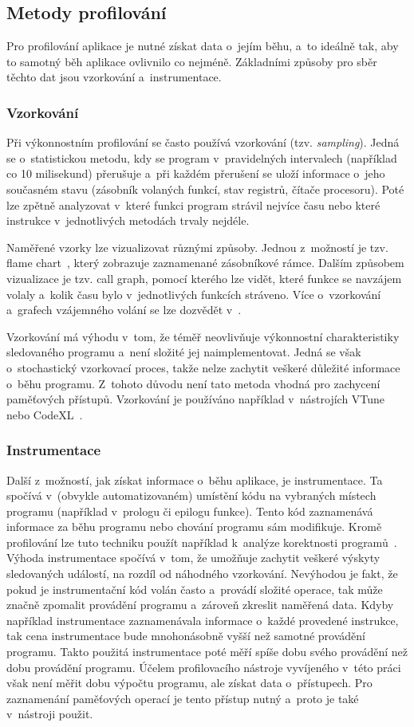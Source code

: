 \subsection{Metody profilování}
Pro profilování aplikace je nutné získat data o~jejím běhu, a~to ideálně tak, aby to samotný běh aplikace ovlivnilo co nejméně. Základními způsoby pro sběr těchto dat jsou vzorkování a~instrumentace.

\subsubsection{Vzorkování}
Při výkonnostním profilování se často používá vzorkování (tzv. \emph{sampling}). Jedná se o~statistickou metodu, kdy se program v~pravidelných intervalech (například co 10 milisekund) přerušuje a~při každém přerušení se uloží informace o~jeho současném stavu (zásobník volaných funkcí, stav registrů, čítače procesoru). Poté lze zpětně analyzovat v~které funkci program strávil nejvíce času nebo které instrukce v~jednotlivých metodách trvaly nejdéle.

Naměřené vzorky lze vizualizovat různými způsoby. Jednou z~možností je tzv. flame chart~\cite{flamegraph}, který zobrazuje zaznamenané zásobníkové rámce. Dalším způsobem vizualizace je tzv. call graph, pomocí kterého lze vidět, které funkce se navzájem volaly a~kolik času bylo v~jednotlivých funkcích stráveno. Více o~vzorkování a~grafech vzájemného volání se lze dozvědět v~\cite{gprof}.

Vzorkování má výhodu v~tom, že téměř neovlivňuje výkonnostní charakteristiky sledovaného programu a~není složité jej naimplementovat. Jedná se však o~stochastický vzorkovací proces, takže nelze zachytit veškeré důležité informace o~běhu programu. Z~tohoto důvodu není tato metoda vhodná pro zachycení paměťových přístupů. Vzorkování je používáno například v~nástrojích VTune~\cite{vtune} nebo CodeXL~\cite{codexl}.

\subsubsection{Instrumentace}
Další z~možností, jak získat informace o~běhu aplikace, je instrumentace. Ta spočívá v~(obvykle automatizovaném) umístění kódu na vybraných místech programu (například v~prologu či epilogu funkce). Tento kód zaznamenává informace za běhu programu nebo chování programu sám modifikuje. Kromě profilování lze tuto techniku použít například k~analýze korektnosti programů~\cite{memcheck}. Výhoda instrumentace spočívá v~tom, že umožňuje zachytit veškeré výskyty sledovaných událostí, na rozdíl od náhodného vzorkování. Nevýhodou je fakt, že pokud je instrumentační kód volán často a~provádí složité operace, tak může značně zpomalit provádění programu a~zároveň zkreslit naměřená data. Kdyby například instrumentace zaznamenávala informace o~každé provedené instrukce, tak cena instrumentace bude mnohonásobně vyšší než samotné provádění programu. Takto použitá instrumentace poté měří spíše dobu svého provádění než dobu provádění programu. Účelem profilovacího nástroje vyvíjeného v~této práci však není měřit dobu výpočtu programu, ale získat data o~přístupech. Pro zaznamenání paměťových \mbox{operací} je tento přístup nutný a~proto je také v~nástroji použit.


